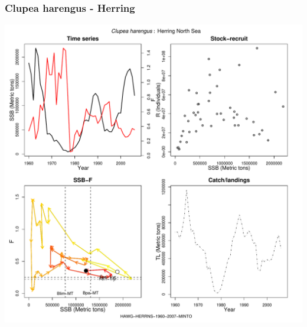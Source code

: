 \subsubsection{Clupea harengus - Herring}
\begin{center}
\includegraphics[width=1.2\textwidth]{../R/figures/HAWG-HERRNS-1960-2007-MINTO.pdf}
\end{center}

